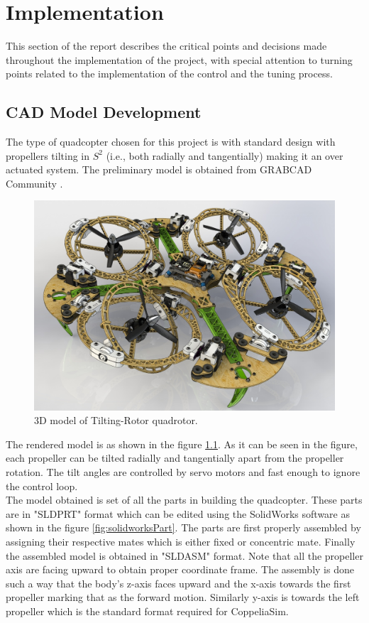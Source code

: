\documentclass[a4paper, 12pt, oneside]{book}
\begin{document}
\chapter{Implementation}\label{impl}
This section of the report describes the critical points and decisions made throughout the implementation of the project, with special attention to turning points related to the implementation of the control and the tuning process.

\section{CAD Model Development}
The type of quadcopter chosen for this project is with standard design with propellers tilting in $S^2$ (i.e., both radially and tangentially) making it an over actuated system. The preliminary model is obtained from GRABCAD Community \cite{NicholasVonKlemperer}. 

\begin{figure}[H]
    \begin{center}
        \includegraphics[width=.6\linewidth]{figures/DesignFull.JPG}
        \caption{3D model of Tilting-Rotor quadrotor.}
        \label{fig:3dmodel}
    \end{center}
\end{figure}

The rendered model is as shown in the figure \ref{fig:3dmodel}. As it can be seen in the figure, each propeller can be tilted radially and tangentially apart from the propeller rotation. The tilt angles are controlled by servo motors and fast enough to ignore the control loop.\\

The model obtained is set of all the parts in building the quadcopter. These parts are in "SLDPRT" format which can be edited using the SolidWorks software as shown in the figure \ref{fig:solidworksPart}. The parts are first properly assembled by assigning their respective mates which is either fixed or concentric mate. Finally the assembled model is obtained in "SLDASM" format. Note that all the propeller axis are facing upward to obtain proper coordinate frame. The assembly is done such a way that the body's z-axis faces upward and the x-axis towards the first propeller marking that as the forward motion. Similarly y-axis is towards the left propeller which is the standard format required for CoppeliaSim. 
\end{document}

